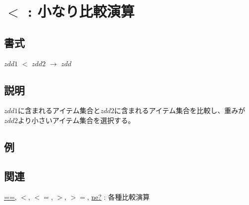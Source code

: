 
\section{$<$ : 小なり比較演算\label{sect:lt}}
\subsection*{書式}
$zdd1$ $<$ $zdd2$ $\rightarrow$ $zdd$

\subsection*{説明}
$zdd1$に含まれるアイテム集合と$zdd2$に含まれるアイテム集合を比較し、重みが$zdd2$より小さいアイテム集合を選択する。


\subsection*{例}


\subsection*{関連}
\hyperref[sect:eq]{==},
\hyperref[sect:lt]{$<$},
\hyperref[sect:le]{$<=$},
\hyperref[sect:gt]{$>$},
\hyperref[sect:ge]{$>=$},
\hyperref[sect:ne]{ne?} : 各種比較演算

